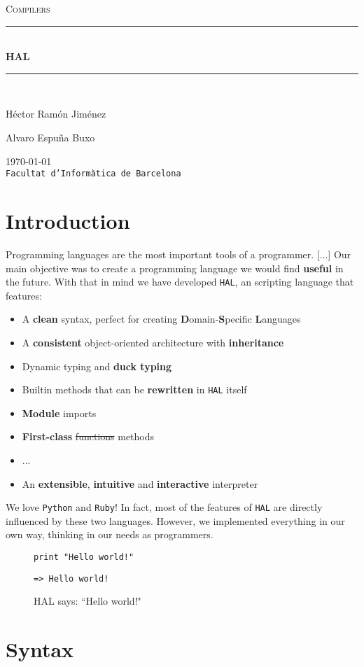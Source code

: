 \documentclass[a4paper,11pt]{article}
\begin{document}
\begin{titlepage}
\begin{center}
\textsc{\Large Compilers}
\\[1.5cm]
\rule{\linewidth}{0.5mm}
\\[0.4cm]
{\huge
\bfseries
HAL
\\[0.4cm]
}
\rule{\linewidth}{0.5mm}
\\[2.5cm]
\begin{minipage}{0.4\textwidth}
\begin{flushleft}
\large
Héctor Ramón Jiménez
\end{flushleft}
\end{minipage}
\begin{minipage}{0.4\textwidth}
\begin{flushright}
\large
Alvaro Espuña Buxo
\end{flushright}
\end{minipage}
\vfill
{\large
\today
}
\\
{\large
\texttt{Facultat d'Informàtica de Barcelona}
}
\end{center}
\end{titlepage}
\tableofcontents
\clearpage
\section{Introduction}
Programming languages are the most important tools of a programmer. [...]
Our main objective was to create a programming language we would find \textbf{useful} in the future.
    With that in mind we have developed \texttt{HAL}, an scripting language that features:
\begin{itemize}
\item
A \textbf{clean} syntax, perfect for creating \textbf{D}omain-\textbf{S}pecific \textbf{L}anguages
\item
A \textbf{consistent} object-oriented architecture with \textbf{inheritance}
\item
Dynamic typing and \textbf{duck typing}
\item
Builtin methods that can be \textbf{rewritten} in \texttt{HAL} itself
\item
\textbf{Module} imports
\item
\textbf{First-class} \st{functions} methods
\item
...
\item
An \textbf{extensible}, \textbf{intuitive} and \textbf{interactive} interpreter
\end{itemize}
We love \texttt{Python} and \texttt{Ruby}! In fact, most of the features of \texttt{HAL} are directly influenced
    by these two languages. However, we implemented everything in our own way, thinking in our
    needs as programmers.
\begin{figure}[h!]
\begin{lstlisting}[language=hal]
print "Hello world!"
\end{lstlisting}
\begin{verbatim}
=> Hello world!
\end{verbatim}
\caption{HAL says: ``Hello world!"}
\end{figure}
\clearpage
\section{Syntax}
\end{document}

